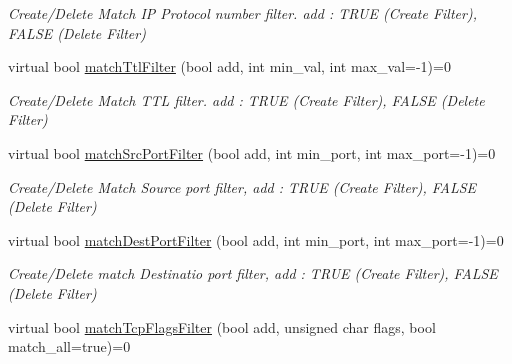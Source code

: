 \begin{DoxyCompactItemize}
\begin{DoxyCompactList}\small\item\em Create/\-Delete Match I\-P Protocol number filter. add \-: T\-R\-U\-E (Create Filter), F\-A\-L\-S\-E (Delete Filter) \end{DoxyCompactList}\item 
\hypertarget{classnxos_1_1NxPolicyEntry_acf14616a0b57bff227f5a3c57277c48a}{virtual bool \hyperlink{classnxos_1_1NxPolicyEntry_acf14616a0b57bff227f5a3c57277c48a}{match\-Ttl\-Filter} (bool add, int min\-\_\-val, int max\-\_\-val=-\/1)=0}\label{classnxos_1_1NxPolicyEntry_acf14616a0b57bff227f5a3c57277c48a}

\begin{DoxyCompactList}\small\item\em Create/\-Delete Match T\-T\-L filter. add \-: T\-R\-U\-E (Create Filter), F\-A\-L\-S\-E (Delete Filter) \end{DoxyCompactList}\item 
\hypertarget{classnxos_1_1NxPolicyEntry_aaa043aa913b28f4b1576ae5e1add81ab}{virtual bool \hyperlink{classnxos_1_1NxPolicyEntry_aaa043aa913b28f4b1576ae5e1add81ab}{match\-Src\-Port\-Filter} (bool add, int min\-\_\-port, int max\-\_\-port=-\/1)=0}\label{classnxos_1_1NxPolicyEntry_aaa043aa913b28f4b1576ae5e1add81ab}

\begin{DoxyCompactList}\small\item\em Create/\-Delete Match Source port filter, add \-: T\-R\-U\-E (Create Filter), F\-A\-L\-S\-E (Delete Filter) \end{DoxyCompactList}\item 
\hypertarget{classnxos_1_1NxPolicyEntry_a6a1ae9efd3ffbaab1946ce742cdb2f20}{virtual bool \hyperlink{classnxos_1_1NxPolicyEntry_a6a1ae9efd3ffbaab1946ce742cdb2f20}{match\-Dest\-Port\-Filter} (bool add, int min\-\_\-port, int max\-\_\-port=-\/1)=0}\label{classnxos_1_1NxPolicyEntry_a6a1ae9efd3ffbaab1946ce742cdb2f20}

\begin{DoxyCompactList}\small\item\em Create/\-Delete match Destinatio port filter, add \-: T\-R\-U\-E (Create Filter), F\-A\-L\-S\-E (Delete Filter) \end{DoxyCompactList}\item 
\hypertarget{classnxos_1_1NxPolicyEntry_aa3ef0522441cb6395b3543afd086faf3}{virtual bool \hyperlink{classnxos_1_1NxPolicyEntry_aa3ef0522441cb6395b3543afd086faf3}{match\-Tcp\-Flags\-Filter} (bool add, unsigned char flags, bool match\-\_\-all=true)=0}\label{classnxos_1_1NxPolicyEntry_aa3ef0522441cb6395b3543afd086faf3}


\end{DoxyCompactItemize}
